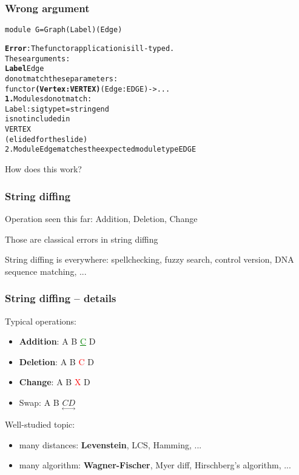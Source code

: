\documentclass[11pt,aspectratio=169]{beamer}
\newcommand{\error}[1]{\textcolor{red}{#1}}
\newcommand{\ok}[1]{\textcolor{green}{#1}}
\begin{document}
\begin{frame}[fragile]\frametitle{Wrong argument}
\begin{verbatim}
module G=Graph(Label)(Edge)
\end{verbatim}
\begin{alltt}
{\bfseries{}\color{red}{}Error}: The functor application is ill-typed.
       These arguments:
         {\color{magenta}{}\bfseries{}Label} {\color{green}{}Edge}
       do not match these parameters:
         functor {\color{magenta}{}\bfseries{}(Vertex : VERTEX)} {\color{green}{}(Edge : EDGE)} -> ...
  {\color{magenta}{}\bfseries{}1.} Modules do not match:
       Label : sig type t = string end
     is not included in
       VERTEX
     (elided for the slide)
  {\color{green}{}2.} Module Edge matches the expected module type EDGE

\end{alltt}
\end{frame}

\begin{frame}[standout]
  \centering \Huge How does this work?
\end{frame}
\begin{frame}\frametitle{String diffing}
\begin{block}{}
  Operation seen this far: Addition, Deletion, Change
\end{block}
\begin{block}{}
   Those are classical errors in string diffing
 \end{block}
 \begin{block}{}String diffing is everywhere:
   spellchecking, fuzzy search, control version, DNA sequence matching, ...
 \end{block}

\end{frame}

\begin{frame}\frametitle{String diffing -- details}
  Typical operations:
  \begin{itemize}
    \item \textbf<2->{Addition}: A B \ok{\underline{C}} D
    \item \textbf<2->{Deletion}: A B \error{{C}} D
    \item \textbf<2->{Change}: A B \error{X} D
    \item Swap: A B $\underset{\leftrightarrow}{C D}$
  \end{itemize}
  Well-studied topic:
  \begin{itemize}
    \item many distances: \textbf<3>{Levenstein}, LCS, Hamming, ...
      \item many algorithm: \textbf<3>{Wagner-Fischer}, Myer diff, Hirschberg's algorithm, ...
  \end{itemize}
\end{frame}
\end{document}

